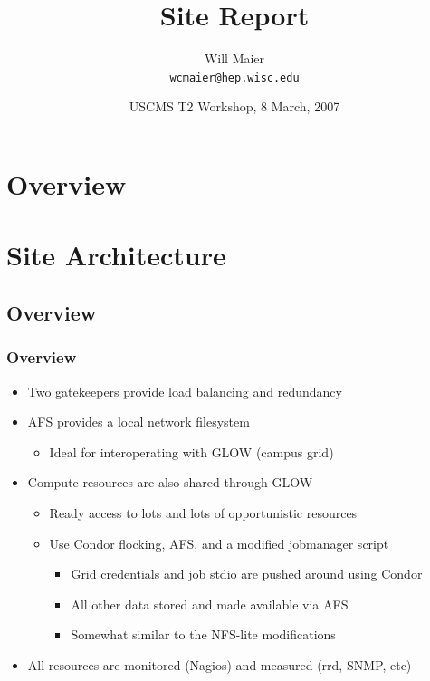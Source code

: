\documentclass{beamer}
\title{Site Report}
\author[Will Maier]{Will Maier \\ \texttt{wcmaier@hep.wisc.edu}}
\institute[Wisconsin]{University of Wisconsin - High Energy Physics}
\date[8 March, 2007]{USCMS T2 Workshop, 8 March, 2007}
\begin{document}

\begin{frame}
    \titlepage
\end{frame}

\section{Overview}
\begin{frame}
    \tableofcontents
\end{frame}

\section{Site Architecture}
\subsection{Overview}
\begin{frame}
\frametitle{Overview}
\begin{itemize}
    \item Two gatekeepers provide load balancing and redundancy
    \item AFS provides a local network filesystem
    \begin{itemize}
        \item Ideal for interoperating with GLOW (campus grid)
    \end{itemize}
    \item Compute resources are also shared through GLOW
    \begin{itemize}
        \item Ready access to lots and lots of opportunistic resources
        \item Use Condor flocking, AFS, and a modified jobmanager script
        \begin{itemize}
            \item Grid credentials and job stdio are pushed around using Condor
            \item All other data stored and made available via AFS
            \item Somewhat similar to the NFS-lite modifications
        \end{itemize}
    \end{itemize}
    \item All resources are monitored (Nagios) and measured (rrd, SNMP, etc)
\end{itemize}
\end{frame}
\end{document}
